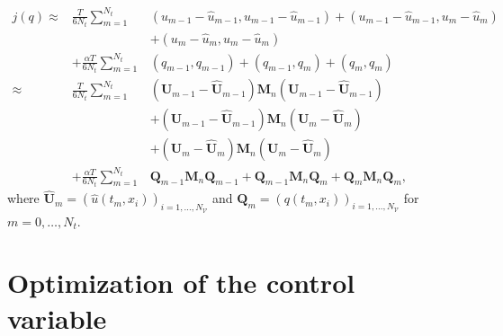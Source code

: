 \begin{eqnarray*}
j(q) \approx& \frac{T}{6N_t}\sum_{m=1}^{N_t}&\left(u_{m-1}-\hat{u}_{m-1},u_{m-1}-\hat{u}_{m-1}\right) + \left(u_{m-1}-\hat{u}_{m-1},u_{m}-\hat{u}_{m}\right)\\
&&+ \left(u_{m}-\hat{u}_{m},u_{m}-\hat{u}_{m}\right)\\
&+ \frac{\alpha T}{6N_t}\sum_{m=1}^{N_t}&\left(q_{m-1},q_{m-1}\right) + \left(q_{m-1},q_{m}\right) + \left(q_{m},q_{m}\right)\\
\approx& \frac{T}{6N_t}\sum_{m=1}^{N_t}&\left(\mathbf{U}_{m-1}-\hat{\mathbf{U}}_{m-1}\right)\mathbf{M}_n\left(\mathbf{U}_{m-1}-\hat{\mathbf{U}}_{m-1}\right)\\
&&+ \left(\mathbf{U}_{m-1}-\hat{\mathbf{U}}_{m-1}\right)\mathbf{M}_n\left(\mathbf{U}_{m}-\hat{\mathbf{U}}_{m}\right)\\
&&+ \left(\mathbf{U}_{m}-\hat{\mathbf{U}}_{m}\right)\mathbf{M}_n\left(\mathbf{U}_{m}-\hat{\mathbf{U}}_{m}\right)\\
&+ \frac{\alpha T}{6N_t}\sum_{m=1}^{N_t}&\mathbf{Q}_{m-1}\mathbf{M}_n\mathbf{Q}_{m-1} + \mathbf{Q}_{m-1}\mathbf{M}_n\mathbf{Q}_{m} + \mathbf{Q}_{m}\mathbf{M}_n\mathbf{Q}_{m},
\end{eqnarray*}
where $\hat{\mathbf{U}}_m=\left(\hat{u}(t_m, x_i)\right)_{i=1,\dotsc,N_\mathcal{V}}$ and $\mathbf{Q}_m=\left(q(t_m, x_i)\right)_{i=1,\dotsc,N_\mathcal{V}}$ for $m=0,\dotsc,N_t$.

\section{Optimization of the control variable}

